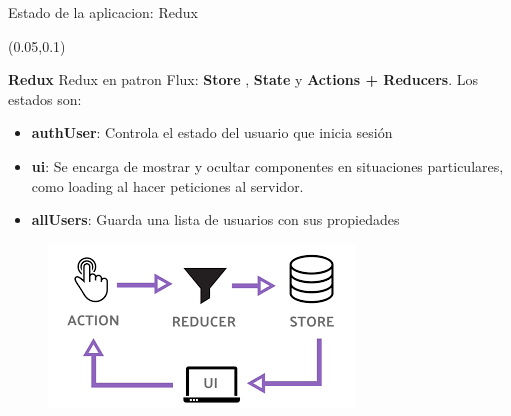 \documentclass[xcolor=pdftex,dvipsnames,table]{beamer}
\begin{document}
\begin{frame}{Estado de la aplicacion: Redux}
\footnotesize {
        \begin{textblock*}{0.45\textwidth}(0.05\textwidth,0.1\textwidth)
            \begin{block}{\textbf{Redux}} 
                    Redux en patron Flux: \textbf{Store} , \textbf{State} y \textbf{Actions + Reducers}. Los estados son:
                    \begin{itemize}
                        \item { \textbf{authUser}: Controla el estado del usuario que inicia sesión}
                        \item { \textbf{ui}: Se encarga de mostrar y ocultar componentes en situaciones particulares, como loading al hacer peticiones al servidor.}
                        \item { \textbf{allUsers}: Guarda una lista de usuarios con sus propiedades}
                    \end{itemize}
            \end{block}
            \vspace{-0.3cm}
            \begin{figure}
                \centering
                \includegraphics[width=0.8\linewidth]{front/flux.png}
            \end{figure}
    \end{textblock*}
    
}
\end{frame}
\end{document}
